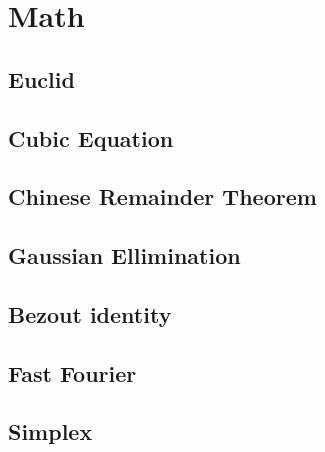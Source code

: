 \newpage
\section{Math}

\subsection{Euclid}
 

\subsection{Cubic Equation}


\subsection{Chinese Remainder Theorem}
\subsection{Gaussian Ellimination}


\subsection{Bezout identity}
\subsection{Fast Fourier}

\subsection{Simplex}

